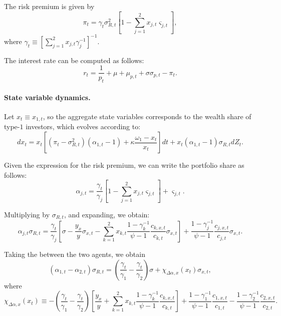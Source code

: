 \documentclass[11pt,english]{article}
\begin{document}
The risk premium is given by
\begin{equation}
    \pi_t = \gamma_t \sigma_{R,t}^2 \left[ 1 - \sum_{j=1}^2 x_{j,t} \varsigma_{j,t} \right],
\end{equation}
where $\gamma_t \equiv \left[\sum_{j=1}^2 x_{j,t} \gamma_j^{-1}\right]^{-1}$.

The interest rate can be computed as follows:
\begin{equation}
    r_t = \frac{1}{p_t} + \mu+\mu_{p,t} + \sigma \sigma_{p,t}  - \pi_t.
\end{equation}

\paragraph{State variable dynamics.} Let $x_t \equiv x_{1,t}$, so the aggregate state variables corresponds to the wealth share of type-$1$ investors, which evolves according to: 
\begin{equation}
d x_t = x_t \left[  (\pi_t-\sigma_{R,t}^2) (\alpha_{1,t}  -1)+ \kappa \frac{\omega_1 - x_t}{x_t} \right]dt + x_t (\alpha_{1,t}-1) \sigma_{R,t} dZ_t.
\end{equation}

Given the expression for the risk premium, we can write the portfolio share as follows:
\begin{equation}
    \alpha_{j,t} = \frac{\gamma_t}{\gamma_j} \left[ 1 - \sum_{j=1}^2 x_{j,t} \varsigma_{j,t} \right] + \varsigma_{j,t}.
\end{equation}

Multiplying by $\sigma_{R,t}$, and expanding, we obtain:
\begin{equation}
    \alpha_{j,t} \sigma_{R,t} = \frac{\gamma_t}{\gamma_j} \left[ \sigma - \frac{y_x}{y} \sigma_{x,t} - \sum_{k=1}^2 x_{k,t} \frac{1-\gamma_k^{-1}}{\psi-1} \frac{c_{k,x,t}}{c_{k,t}} \sigma_{x,t} \right] + \frac{1-\gamma_j^{-1}}{\psi-1} \frac{c_{j,x,t}}{c_{j,t}} \sigma_{x,t}.
\end{equation}

Taking the between the two agents, we obtain
\begin{equation}
    \left( \alpha_{1,t} - \alpha_{2,t}\right) \sigma_{R,t} = \left(\frac{\gamma_t}{\gamma_1} - \frac{\gamma_t}{\gamma_2} \right) \sigma + \chi_{\Delta \alpha, x}(x_t) \sigma_{x,t},
\end{equation}
where
\begin{equation}
    \chi_{\Delta \alpha, x}(x_t) \equiv 
    -\left(\frac{\gamma_t}{\gamma_1} - \frac{\gamma_t}{\gamma_2} \right) \left[
    \frac{y_x}{y}  + \sum_{k=1}^2 x_{k,t} \frac{1-\gamma_k^{-1}}{\psi-1} \frac{c_{k,x,t}}{c_{k,t}} 
    \right] + \frac{1-\gamma_1^{-1}}{\psi-1} \frac{c_{1,x,t}}{c_{1,t}} -\frac{1-\gamma_2^{-1}}{\psi-1} \frac{c_{2,x,t}}{c_{2,t}}.
\end{equation}
\end{document}
